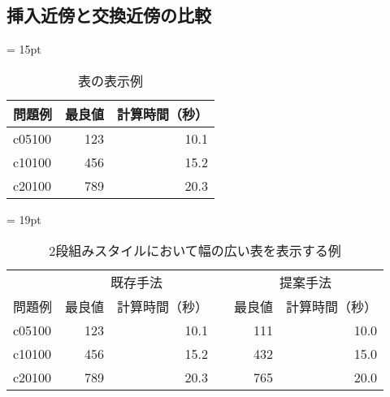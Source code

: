 \subsection{挿入近傍と交換近傍の比較}


\begin{table}[htbp]
 \centering
 \tabcolsep = 15pt
 \renewcommand{\arraystretch}{0.8}
 \caption{表の表示例}
 \label{table1}
 \begin{tabular}{lrr} \hline
  問題例 & 最良値 & 計算時間（秒） \\ \hline
  c05100 &    123 & 10.1 \\
  c10100 &    456 & 15.2 \\
  c20100 &    789 & 20.3 \\ \hline
 \end{tabular}
\end{table}


\begin{table*}
 \centering
 \tabcolsep = 19pt
 \renewcommand{\arraystretch}{0.8}
 \caption{2段組みスタイルにおいて幅の広い表を表示する例}
 \label{table2}
 \begin{tabular}{lrrcrr} \hline
  &\multicolumn{2}{c}{既存手法} && \multicolumn{2}{c}{提案手法}\\ \cline{2-3} \cline{5-6}

  問題例 & 最良値 & 計算時間（秒）&& 最良値 & 計算時間（秒） \\ \hline
  c05100 &    123 &          10.1 &&    111 &          10.0 \\
  c10100 &    456 &          15.2 &&    432 &          15.0 \\
  c20100 &    789 &          20.3 &&    765 &          20.0 \\ \hline
 \end{tabular}
\end{table*}
